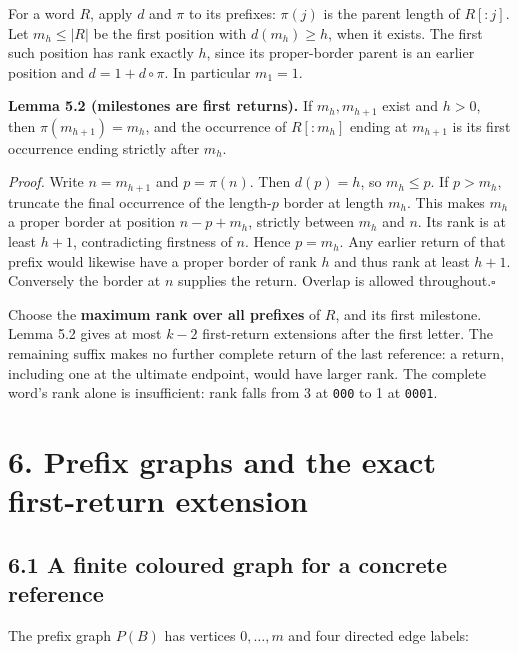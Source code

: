\documentclass[
  11pt,
  a4paper,
]{article}
\begin{document}
For a word \(R\), apply \(d\) and \(\pi\) to its prefixes: \(\pi(j)\) is
the parent length of \(R[:j]\). Let \(m_h\le |R|\) be the first position
with \(d(m_h)\ge h\), when it exists. The first such position has rank
exactly \(h\), since its proper-border parent is an earlier position and
\(d=1+d\circ\pi\). In particular \(m_1=1\).


\textbf{Lemma 5.2 (milestones are first returns).} If \(m_h,m_{h+1}\)
exist and \(h>0\), then \(\pi(m_{h+1})=m_h\), and the occurrence of
\(R[:m_h]\) ending at \(m_{h+1}\) is its first occurrence ending
strictly after \(m_h\).

\emph{Proof.} Write \(n=m_{h+1}\) and \(p=\pi(n)\). Then \(d(p)=h\), so
\(m_h\le p\). If \(p>m_h\), truncate the final occurrence of the
length-\(p\) border at length \(m_h\). This makes \(m_h\) a proper
border at position \(n-p+m_h\), strictly between \(m_h\) and \(n\). Its
rank is at least \(h+1\), contradicting firstness of \(n\). Hence
\(p=m_h\). Any earlier return of that prefix would likewise have a
proper border of rank \(h\) and thus rank at least \(h+1\). Conversely
the border at \(n\) supplies the return. Overlap is allowed
throughout.\nobreak\hspace{.5em}\(\square\)

Choose the \textbf{maximum rank over all prefixes} of \(R\), and its
first milestone. Lemma 5.2 gives at most \(k-2\) first-return extensions
after the first letter. The remaining suffix makes no further complete
return of the last reference: a return, including one at the ultimate
endpoint, would have larger rank. The complete word's rank alone is
insufficient: rank falls from 3 at \texttt{000} to 1 at \texttt{0001}.


\section{6. Prefix graphs and the exact first-return
extension}\label{prefix-graphs-and-the-exact-first-return-extension}

\subsection{6.1 A finite coloured graph for a concrete
reference}\label{a-finite-coloured-graph-for-a-concrete-reference}

The prefix graph \(P(B)\) has vertices \(0,\ldots,m\) and four directed
edge labels:
\end{document}
